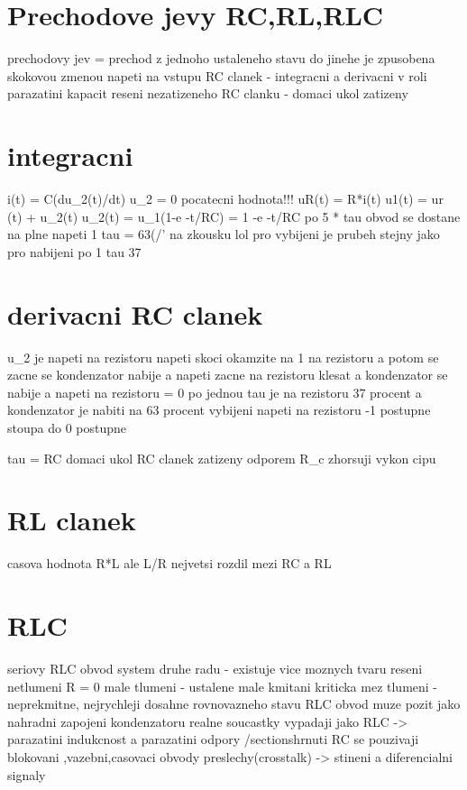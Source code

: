 \documentclass{article}
\begin{document}
\sloppy
\section{Prechodove jevy RC,RL,RLC}
prechodovy jev = prechod z jednoho ustaleneho stavu do jinehe
je zpusobena skokovou zmenou napeti na vstupu
RC clanek - integracni a derivacni
v roli parazatini kapacit
reseni nezatizeneho RC clanku - domaci ukol zatizeny
\section{integracni}
i(t) = C(du_2(t)/dt) u_2 = 0 pocatecni hodnota!!!
uR(t) = R*i(t)
u1(t) = ur (t) + u_2(t)
u_2(t) = u_1(1-e -t/RC) = 1 -e -t/RC
po 5 * tau obvod se dostane na plne napeti
1 tau = 63(/'%
na zkousku lol
pro vybijeni je prubeh stejny jako pro nabijeni po 1 tau 37%
\section{derivacni RC clanek}
u_2 je napeti na rezistoru
napeti skoci okamzite na 1 na rezistoru a potom se zacne se kondenzator nabije
a napeti zacne na rezistoru klesat a kondenzator se nabije a napeti na rezistoru = 0
po jednou tau je na rezistoru 37 procent a kondenzator je nabiti na 63 procent
vybijeni napeti na rezistoru -1 postupne stoupa do 0 postupne

tau = RC
domaci ukol RC clanek zatizeny odporem R_c
zhorsuji vykon cipu
\section{RL clanek}
casova hodnota R*L ale L/R nejvetsi rozdil mezi RC a RL
\section{RLC}
seriovy RLC obvod
system druhe radu - existuje vice moznych tvaru reseni
netlumeni R = 0
male tlumeni - ustalene male kmitani
kriticka mez tlumeni - neprekmitne, nejrychleji dosahne rovnovazneho stavu
RLC obvod muze pozit jako nahradni zapojeni kondenzatoru
realne soucastky vypadaji jako RLC -> parazatini indukcnost a parazatini odpory
/section{shrnuti}
RC se pouzivaji blokovani ,vazebni,casovaci obvody
preslechy(crosstalk) -> stineni a diferencialni signaly
\end{document}
